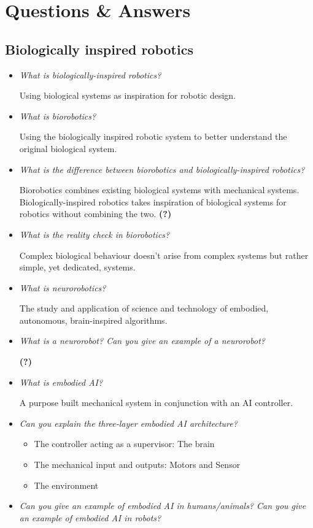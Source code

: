 \documentclass[
    fontsize      = 11pt,
    paper         = a4,
    twoside       = false,
    parskip       = half,
    pagesize      = false,
]{scrartcl}
\providecommand{\tightlist}{%
  \setlength{\itemsep}{0pt}\setlength{\parskip}{0pt}}
\begin{document}
\hypertarget{questions-answers}{%
\section{Questions \& Answers}\label{questions-answers}}

\hypertarget{biologically-inspired-robotics}{%
\subsection{Biologically inspired
robotics}\label{biologically-inspired-robotics}}

\begin{itemize}
\item
  \emph{What is biologically-inspired robotics?}

  Using biological systems as inspiration for robotic design.
\item
  \emph{What is biorobotics?}

  Using the biologically inspired robotic system to better understand
  the original biological system.
\item
  \emph{What is the difference between biorobotics and
  biologically-inspired robotics?}

  Biorobotics combines existing biological systems with mechanical
  systems. Biologically-inspired robotics takes inspiration of
  biological systems for robotics without combining the two.
  \textbf{(?)}
\item
  \emph{What is the reality check in biorobotics?}

  Complex biological behaviour doesn't arise from complex systems but
  rather simple, yet dedicated, systems.
\item
  \emph{What is neurorobotics?}

  The study and application of science and technology of embodied,
  autonomous, brain-inspired algorithms.
\item
  \emph{What is a neurorobot? Can you give an example of a neurorobot?}

  \textbf{(?)}
\item
  \emph{What is embodied AI?}

  A purpose built mechanical system in conjunction with an AI
  controller.
\item
  \emph{Can you explain the three-layer embodied AI architecture?}

  \begin{itemize}
  \tightlist
  \item
    The controller acting as a supervisor: The brain
  \item
    The mechanical input and outputs: Motors and Sensor
  \item
    The environment
  \end{itemize}
\item
  \emph{Can you give an example of embodied AI in humans/animals? Can
  you give an example of embodied AI in robots?}


\end{itemize}
\end{document}
